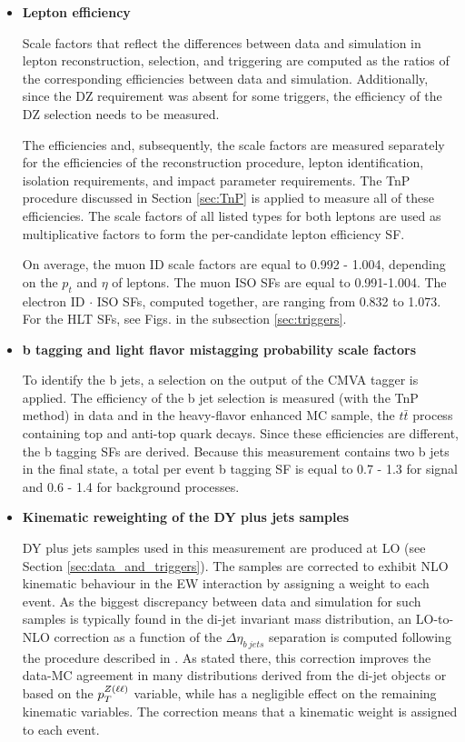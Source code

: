 \begin{itemize}

\item{\bfseries Lepton efficiency} 

Scale factors that reflect the differences between data and simulation in lepton 
reconstruction, selection, and triggering are computed as the ratios of the corresponding
efficiencies between data and simulation. Additionally, since the DZ requirement was absent for some triggers, the efficiency of the DZ selection needs to be measured. 

The efficiencies and, subsequently, the scale factors are measured separately for the efficiencies of the reconstruction procedure, lepton identification, isolation requirements, and impact parameter requirements. The TnP procedure discussed in Section \ref{sec:TnP} is applied to measure all of these efficiencies. The scale factors of all listed types for both leptons are used as multiplicative factors
to form the per-candidate lepton efficiency SF.

On average, the muon ID scale factors are equal to 0.992 - 1.004, depending on the $p_t$ and $\eta$ of leptons. The muon ISO SFs are equal to 0.991-1.004. The electron ID $\cdot$ ISO SFs, computed together, are ranging from 0.832 to 1.073. For the HLT SFs, see Figs. in the subsection \ref{sec:triggers}.

\item{\bfseries b tagging and light flavor mistagging probability scale factors} 

To identify the b jets, a selection on the output of the CMVA tagger is applied. The efficiency of the b jet selection is measured (with the TnP method) in data and in the heavy-flavor enhanced MC sample, the $t\bar{t}$ process containing top and anti-top quark decays. Since these efficiencies are different, the b tagging SFs are derived. Because this measurement contains two b jets in the final state, a total per event b tagging SF is equal to 0.7 - 1.3 for signal and 0.6 - 1.4 for background processes. 

\item{\bfseries Kinematic reweighting of the DY plus jets samples} 
\label{DY_reweighting}

DY plus jets samples used in this measurement are produced at LO (see Section \ref{sec:data_and_triggers}). The samples are corrected to exhibit NLO kinematic behaviour in the EW interaction by assigning a weight to each event. As the biggest discrepancy between data and simulation for such samples is typically found in the di-jet invariant mass distribution, an LO-to-NLO correction as a function of the $\Delta \eta_{b\ jets}$ separation is computed following the procedure described in \cite{DYLOtoNLO}. As stated there, this correction improves the data-MC agreement in many distributions derived from the di-jet objects or based on the $p_T^{Z(\ell\ell)}$ variable, while has a negligible effect on the remaining kinematic variables. The correction means that a kinematic weight is assigned to each event.


\end{itemize}
